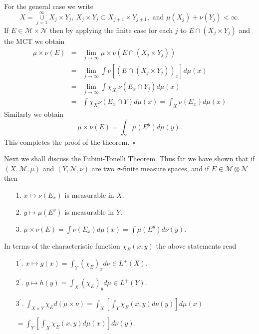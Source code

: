 \documentclass[12pt]{report}
\begin{document}
\vspace{.2cm} 
For the general case we write
\[ X = \overset{\infty}{\underset{j=1}{\cup}} X_j \times Y_j, \ X_j \times
Y_j
\subset X_{j+1}
\times Y_{j+1}, \mbox{ and } \mu(X_j) + \nu(Y_j) < \infty.
\] If $E \in \mathcal{M} \times \mathcal{N}$ then by applying the  finite
case for each $j$ to $E \cap (X_j \times Y_j)$ and the MCT we obtain
\begin{eqnarray*}
\mu \times \nu(E) &=& \lim_{j \to \infty} \mu \times \nu(E \cap (X_j
\times Y_j))\\ &=& \lim_{j \to \infty} \int \nu \left [ (E \cap (X_j \times
Y_j))_x\right ] d
\mu(x)\\ &=& \lim_{j \to \infty} \int \chi_{X_j} \nu (E_x \cap Y_j) d
\mu(x)\\ &=& \int \chi_X \nu(E_x \cap Y) d \mu(x) = \int_X \nu(E_x) d
\mu(x) 
\end{eqnarray*} Similarly we obtain
\[
\mu \times \nu(E) = \int_Y \mu(E^y) d \mu(y).
\] 
This completes the proof of the theorem. \,$\square$


\vspace{.25cm}
Next we shall discuss the Fubini-Tonelli Theorem.
Thus far we have shown that if $(X, \mathcal{M},
\mu)$ and  $(Y, \mathcal{N},
\nu)$ are two $\sigma$-finite measure spaces, and if $E \in
\mathcal{M} \otimes \mathcal{N}$ then
\begin{itemize}
\item[1.]  $x \longmapsto \nu(E_x)$ is measurable in $X$.
\item[2.]  $y \longmapsto \mu(E^y)$ is measurable in $Y$.
\item[3.]  $\mu \times \nu(E) = \int \nu(E_x) d \mu(x) = \int
\mu(E^y) d \nu(y)$.
\end{itemize}

\vspace{.15cm}
\noindent
In terms of the characteristic function $\chi_E (x, y)$ the
above statements read

\vspace{.15cm}
\begin{itemize}
\item[$1^\prime.$]  $x \longmapsto g(x) = \int_Y(\chi_E)_x
d \nu \in L^+ (X)$.
\item[$2^\prime.$]  $y \longmapsto h(y) = \int_X (\chi_E)_y
d \mu \in L^+ (Y).$
\item[$3^\prime$.]  
$\int_{X \times Y} \chi_E d (\mu \times \nu) = \int_X
\left [
\int_Y \chi_E (x, y) d \nu(y) \right ]d \mu(x)$ 

\hspace{3.cm} $= \int_Y \left [ \int_X \chi_E(x, y) d \mu(x) \right ] d
\nu(y).$
\end{itemize}  
\end{document}
